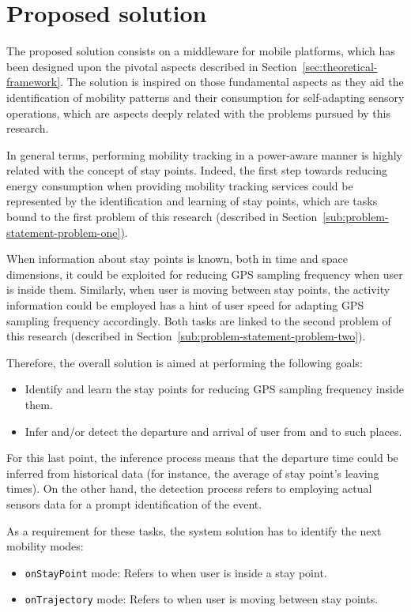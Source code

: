 \documentclass[ENG,PhD]{cinvestav}
\begin{document}
\section{Proposed solution}\label{sec:solution}
The proposed solution consists on a middleware for mobile platforms, which has been designed upon the pivotal aspects described in Section~\ref{sec:theoretical-framework}.
The solution is inspired on those fundamental aspects as they aid the identification of mobility patterns and their consumption for self-adapting sensory operations, which are aspects deeply related with the problems pursued by this research.

In general terms, performing mobility tracking in a power-aware manner is highly related with the concept of stay points.
Indeed, the first step towards reducing energy consumption when providing mobility tracking services could be represented by the identification and learning of stay points, which are tasks bound to the first problem of this research (described in Section~\ref{sub:problem-statement-problem-one}).

When information about stay points is known, both in time and space dimensions, it could be exploited for reducing GPS sampling frequency when user is inside them.
Similarly, when user is moving between stay points, the activity information could be employed has a hint of user speed for adapting GPS sampling frequency accordingly.
Both tasks are linked to the second problem of this research (described in Section~\ref{sub:problem-statement-problem-two}).

Therefore, the overall solution is aimed at performing the following goals:
\begin{itemize}
  \item Identify and learn the stay points for reducing GPS sampling frequency inside them.
  \item Infer and/or detect the departure and arrival of user from and to such places.
\end{itemize}

For this last point, the inference process means that the departure time could be inferred from historical data (for instance, the average of stay point's leaving times).
On the other hand, the detection process refers to employing actual sensors data for a prompt identification of the event.

As a requirement for these tasks, the system solution has to identify the next mobility modes:
\begin{itemize}
  \item \texttt{onStayPoint} mode: Refers to when user is inside a stay point.
  \item \texttt{onTrajectory} mode: Refers to when user is moving between stay points.
\end{itemize}
\end{document}
